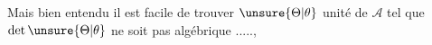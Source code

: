 
Mais bien entendu il est facile de trouver $\unsure{\Theta|\theta}$ unité de $\mathcal A$  tel que $\det\unsure{\Theta|\theta}$ ne soit pas algébrique .....,


